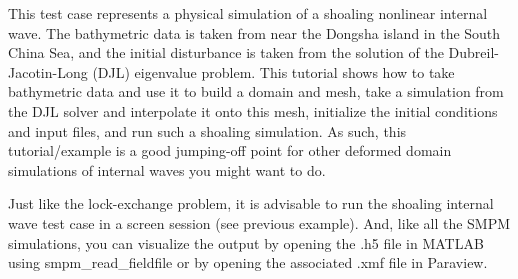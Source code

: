 \documentclass[onside]{article}
\begin{document}
This test case represents a physical simulation of a shoaling nonlinear internal wave.  The bathymetric data is taken from near the Dongsha island in the South China Sea, and the initial disturbance is taken from the solution of the Dubreil-Jacotin-Long (DJL) eigenvalue problem.  This tutorial shows how to take bathymetric data and use it to build a domain and mesh, take a simulation from the DJL solver and interpolate it onto this mesh, initialize the initial conditions and input files, and run such a shoaling simulation.  As such, this tutorial/example is a good jumping-off point for other deformed domain simulations of internal waves you might want to do.

Just like the lock-exchange problem, it is advisable to run the shoaling internal wave test case in a screen session (see previous example).  And, like all the SMPM simulations, you can visualize the output by opening the .h5 file in MATLAB using smpm\_read\_fieldfile or by opening the associated .xmf file in Paraview.
\end{document}
